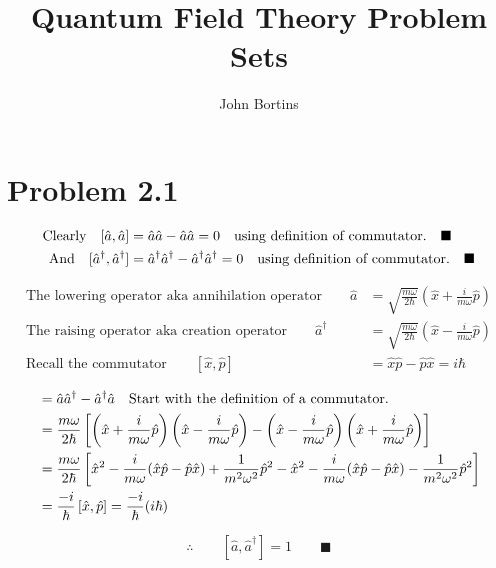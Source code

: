 \documentclass{amsart}
\title{Quantum Field Theory Problem Sets}
\author{John Bortins}
\begin{document}
 
\maketitle{}
 
\section*{Problem 2.1}

\begin{align*}
    \qq*{Clearly} [\hat{a},\hat{a}]  &= \hat{a}\hat{a}-\hat{a}\hat{a}=0\qq{using definition of commutator.}\blacksquare \\
    \qq*{And} [\hat{a}^\dagger,\hat{a}^\dagger]  &= \hat{a}^\dagger\hat{a}^\dagger-\hat{a}^\dagger\hat{a}^\dagger=0\qq{using definition of commutator.}\blacksquare 
\end{align*}

\begin{align*}
    \text{The lowering operator aka annihilation operator}\qquad\hat{a}  &= \sqrt{\frac{m\omega}{2\hbar}}\left(\hat{x} + \frac{i}{m\omega}\hat{p}\right) \\
    \text{The raising operator aka creation operator}\qquad\hat{a}^\dagger  &= \sqrt{\frac{m\omega}{2\hbar}}\left(\hat{x} - \frac{i}{m\omega}\hat{p}\right)\\
    \text{Recall the commutator}\qquad[\hat{x},\hat{p}]  &= \hat{x}\hat{p}-\hat{p}\hat{x}=i\hbar
\end{align*}

\begin{align*}
    [\hat{a},\hat{a}^\dagger] &= \hat{a}\hat{a}^\dagger-\hat{a}^\dagger\hat{a}\qq{Start with the definition of a commutator.}\\
    &= \frac{m\omega}{2\hbar}\left[\left(\hat{x} + \frac{i}{m\omega}\hat{p}\right)\left(\hat{x} - \frac{i}{m\omega}\hat{p}\right)-\left(\hat{x} - \frac{i}{m\omega}\hat{p}\right)\left(\hat{x} + \frac{i}{m\omega}\hat{p}\right)\right]\\
    &= \frac{m\omega}{2\hbar}\left[\hat{x}^2 - \frac{i}{m\omega}(\hat{x}\hat{p}-\hat{p}\hat{x}) + \frac{1}{m^2\omega^2}\hat{p}^2-\hat{x}^2 - \frac{i}{m\omega}(\hat{x}\hat{p}-\hat{p}\hat{x}) - \frac{1}{m^2\omega^2}\hat{p}^2\right]\\
    &= \frac{-i}{\hbar}\left[ \hat{x},\hat{p}\right]= \frac{-i}{\hbar} (i\hbar)\\
\end{align*}  

  \[\therefore\qquad[\hat{a},\hat{a}^\dagger] =1 \qquad\blacksquare\]
\end{document}
